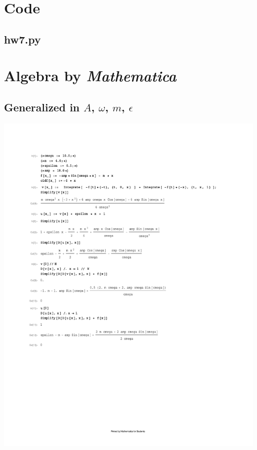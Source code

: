 \documentclass[10pt]{article}
\newcommand{\code}[2]{
    \subsection*{#1}
    
    \vspace{2em}
}
\begin{document}
\clearpage

\section{Code}
\label{sec:code}

\code{hw7.py}{hw7.py}

\section{Algebra by \textit{Mathematica}}
\label{sec:mathematica}

% 
\subsection{Generalized in $A$, $\omega$, $m$, $\epsilon$}
\includegraphics[width=\columnwidth,keepaspectratio=true]{hw7-mathematica-general.pdf}

\pagebreak
\end{document}

